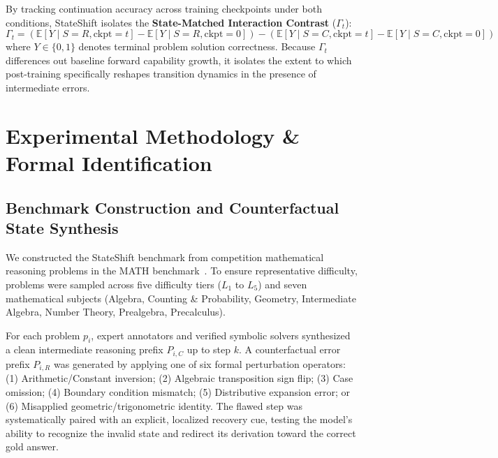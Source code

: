 \documentclass[11pt]{article}
\begin{document}
By tracking continuation accuracy across training checkpoints under both conditions, StateShift isolates the \textbf{State-Matched Interaction Contrast} ($\Gamma_t$):
\begin{equation}
\Gamma_t = \left( \mathbb{E}[Y \mid S = R, \text{ckpt} = t] - \mathbb{E}[Y \mid S = R, \text{ckpt} = 0] \right) - \left( \mathbb{E}[Y \mid S = C, \text{ckpt} = t] - \mathbb{E}[Y \mid S = C, \text{ckpt} = 0] \right)
\end{equation}
where $Y \in \{0, 1\}$ denotes terminal problem solution correctness. Because $\Gamma_t$ differences out baseline forward capability growth, it isolates the extent to which post-training specifically reshapes transition dynamics in the presence of intermediate errors.

\section{Experimental Methodology \& Formal Identification}

\subsection{Benchmark Construction and Counterfactual State Synthesis}
We constructed the StateShift benchmark from competition mathematical reasoning problems in the MATH benchmark~\cite{Hendrycks2021Measuring}. To ensure representative difficulty, problems were sampled across five difficulty tiers ($L_1$ to $L_5$) and seven mathematical subjects (Algebra, Counting \& Probability, Geometry, Intermediate Algebra, Number Theory, Prealgebra, Precalculus).

For each problem $p_i$, expert annotators and verified symbolic solvers synthesized a clean intermediate reasoning prefix $P_{i,C}$ up to step $k$. A counterfactual error prefix $P_{i,R}$ was generated by applying one of six formal perturbation operators: (1) Arithmetic/Constant inversion; (2) Algebraic transposition sign flip; (3) Case omission; (4) Boundary condition mismatch; (5) Distributive expansion error; or (6) Misapplied geometric/trigonometric identity. The flawed step was systematically paired with an explicit, localized recovery cue, testing the model's ability to recognize the invalid state and redirect its derivation toward the correct gold answer.
\end{document}
